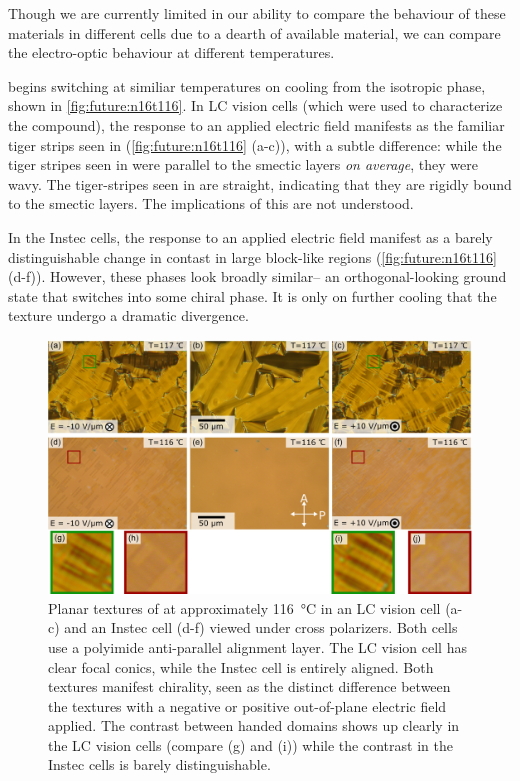 \documentclass[aagreenthesis]{subfiles}
\begin{document}
Though we are currently limited in our ability to compare the behaviour of these
materials in different cells due to a dearth of available material, we can
compare the electro-optic behaviour at different temperatures.

\nsix{} begins switching at similiar temperatures on cooling from the isotropic
phase, shown in \autoref{fig:future:n16t116}. In LC vision cells (which were used to characterize the \nfour{}
compound), the response to an applied electric field manifests as the familiar
tiger strips seen in \nfour{} (\autoref{fig:future:n16t116} (a-c)), with a subtle difference: while the tiger stripes
seen in \nfour{} were parallel to the smectic layers \textit{on average}, they
were wavy. The tiger-stripes seen in \nsix{} are straight, indicating that they
are rigidly bound to the smectic layers. The implications of this are not
understood.

In the Instec cells, the response to an applied electric field manifest as a
barely distinguishable change in contast in large block-like regions
(\autoref{fig:future:n16t116}(d-f)). However,
these phases look broadly similar-- an orthogonal-looking ground state that
switches into some chiral phase. It is only on further cooling that the texture
undergo a dramatic divergence.


\begin{figure}[h!]
    \centering
    \includegraphics[width=\textwidth]{figs/pal30/future/LCvIn116.png}
    \caption{\label{fig:future:n16t116} Planar textures of \nsix{} at approximately
        \SI{116}{\degreeCelsius} in an LC vision cell
    (a-c) and an Instec cell (d-f) viewed under cross polarizers. Both cells use a polyimide anti-parallel
alignment layer. The LC vision cell has clear focal conics, while the Instec
cell is entirely aligned. Both textures manifest chirality, seen as the distinct
difference between the textures with a negative or positive out-of-plane
electric field applied. The contrast between handed domains shows up clearly in
the LC vision cells (compare (g) and (i)) while the contrast in the Instec cells
is barely distinguishable. }
\end{figure}
\end{document}

